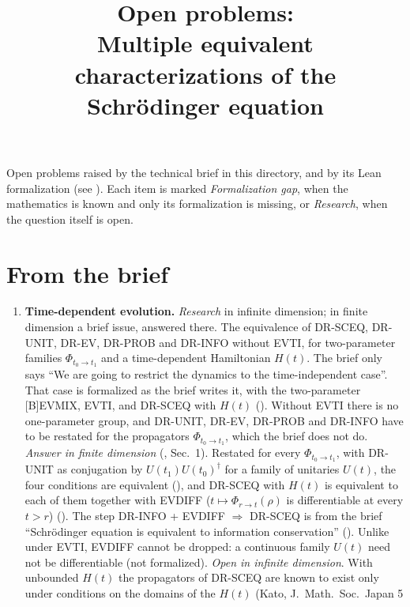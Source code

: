 \documentclass[11pt]{article}
\title{Open problems:\\ Multiple equivalent characterizations of the Schr\"odinger equation}
\author{}
\date{}
\begin{document}
\maketitle

\noindent
Open problems raised by the technical brief in this directory, and by its Lean formalization
(see ).
Each item is marked \emph{Formalization gap}, when the mathematics is known and only its
formalization is missing, or \emph{Research}, when the question itself is open.

\section*{From the brief}
\begin{enumerate}
\item \textbf{Time-dependent evolution.} \emph{Research} in infinite dimension; in finite
  dimension a brief issue, answered there. The equivalence of DR-SCEQ, DR-UNIT, DR-EV, DR-PROB and
  DR-INFO without EVTI, for two-parameter families $\Phi_{t_0 \to t_1}$ and a time-dependent
  Hamiltonian $H(t)$. The brief only says ``We are going to restrict the dynamics to the
  time-independent case''. That case is formalized as the brief writes it, with the two-parameter
  [B]EVMIX, EVTI, and DR-SCEQ with $H(t)$ (). Without EVTI
  there is no one-parameter group, and DR-UNIT, DR-EV, DR-PROB and DR-INFO have to be restated
  for the propagators $\Phi_{t_0 \to t_1}$, which the brief does not do.
  \emph{Answer in finite dimension} (, Sec.~1). Restated for every
  $\Phi_{t_0\to t_1}$, with DR-UNIT as conjugation by $U(t_1)U(t_0)^\dagger$ for a family of
  unitaries $U(t)$, the four conditions are equivalent
  (), and DR-SCEQ with $H(t)$ is
  equivalent to each of them together with EVDIFF ($t \mapsto \Phi_{r\to t}(\rho)$ is
  differentiable at every $t > r$) ().
  The step DR-INFO + EVDIFF $\Rightarrow$ DR-SCEQ is from the brief ``Schr\"odinger equation is
  equivalent to information conservation''
  (). Unlike under EVTI, EVDIFF
  cannot be dropped: a continuous family $U(t)$ need not be differentiable (not formalized).
  \emph{Open in infinite dimension}. With unbounded $H(t)$ the propagators of DR-SCEQ are known to
  exist only under conditions on the domains of the $H(t)$ (Kato, J.\ Math.\ Soc.\ Japan 5

\end{enumerate}
\end{document}
